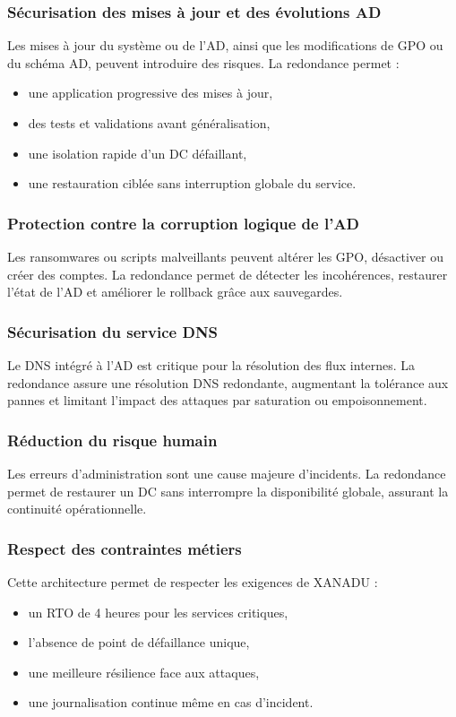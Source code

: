 \subsubsection*{Sécurisation des mises à jour et des évolutions AD}
\noindent Les mises à jour du système ou de l’AD, ainsi que les modifications de GPO ou du schéma AD, peuvent introduire des risques. La redondance permet :
\begin{itemize}
    \item une application progressive des mises à jour,
    \item des tests et validations avant généralisation,
    \item une isolation rapide d’un DC défaillant,
    \item une restauration ciblée sans interruption globale du service.
\end{itemize}

\subsubsection*{Protection contre la corruption logique de l’AD}
\noindent Les ransomwares ou scripts malveillants peuvent altérer les GPO, désactiver ou créer des comptes. La redondance permet de détecter les incohérences, restaurer l’état de l’AD et améliorer le rollback grâce aux sauvegardes.

\subsubsection*{Sécurisation du service DNS}
\noindent Le DNS intégré à l’AD est critique pour la résolution des flux internes. La redondance assure une résolution DNS redondante, augmentant la tolérance aux pannes et limitant l’impact des attaques par saturation ou empoisonnement.

\subsubsection*{Réduction du risque humain}
\noindent Les erreurs d’administration sont une cause majeure d’incidents. La redondance permet de restaurer un DC sans interrompre la disponibilité globale, assurant la continuité opérationnelle.

\newpage

\subsubsection*{Respect des contraintes métiers}
\noindent Cette architecture permet de respecter les exigences de XANADU :
\begin{itemize}
    \item un RTO de 4 heures pour les services critiques,
    \item l’absence de point de défaillance unique,
    \item une meilleure résilience face aux attaques,
    \item une journalisation continue même en cas d’incident.
\end{itemize}

